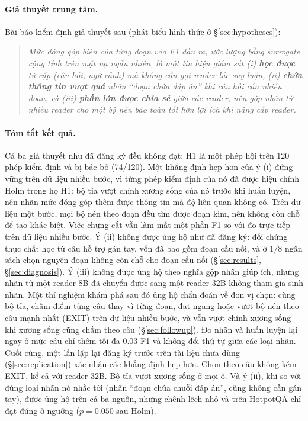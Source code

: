 \documentclass[11pt]{article}
\begin{document}
\paragraph{Giả thuyết trung tâm.} Bài báo kiểm định giả thuyết sau (phát biểu
hình thức ở \S\ref{sec:hypotheses}):
\begin{quote}\itshape
Mức đóng góp biên của từng đoạn vào F1 đầu ra, ước lượng bằng surrogate cộng tính
trên mặt nạ ngẫu nhiên, là một tín hiệu giám sát (i) \textbf{học được} từ cặp
(câu hỏi, ngữ cảnh) mà không cần gọi reader lúc suy luận, (ii) \textbf{chứa thông
tin vượt quá} nhãn ``đoạn chứa đáp án'' khi câu hỏi cần nhiều đoạn, và (iii)
\textbf{phần lớn được chia sẻ} giữa các reader, nên gộp nhãn từ nhiều reader cho một
bộ nén bảo toàn tốt hơn lợi ích khi nâng cấp reader.
\end{quote}

\paragraph{Tóm tắt kết quả.} Cả ba giả thuyết như đã đăng ký đều không đạt; H1 là một phép hội trên 120 phép kiểm
định và bị bác bỏ (74/120). Một khẳng định hẹp hơn của ý (i) đứng vững trên dữ liệu nhiều bước, vì từng phép kiểm
định của nó đã được hiệu chỉnh Holm trong họ H1: bộ tỉa vượt chính xương sống của nó trước khi huấn luyện, nên nhãn
mức đóng góp thêm được thông tin mà độ liên quan không có.
Trên dữ liệu một bước, mọi bộ nén theo đoạn đều tìm được đoạn kim, nên không còn chỗ để tạo khác biệt.
Việc chưng cất vẫn làm mất một phần F1 so với đo trực tiếp trên dữ liệu nhiều bước. Ý (ii) không được ủng
hộ như đã đăng ký: đối chứng thực chất học từ câu hỗ trợ gán tay, vốn đã bao gồm đoạn cầu nối, và ở $1/8$ ngân sách
chọn nguyên đoạn không còn chỗ cho đoạn cầu nối (\S\ref{sec:results}, \S\ref{sec:diagnosis}). Ý (iii) không được
ủng hộ theo nghĩa gộp nhãn giúp ích, nhưng nhãn từ một reader 8B đã chuyển được sang một reader 32B
không tham gia sinh nhãn. Một thí nghiệm khám phá sau đó ủng hộ chẩn đoán về đơn vị chọn: cùng bộ tỉa, chấm
điểm từng câu thay vì từng đoạn, đạt ngang hoặc vượt bộ nén theo câu mạnh nhất (EXIT) trên dữ liệu nhiều bước,
và vẫn vượt chính xương sống khi xương sống cũng chấm theo câu (\S\ref{sec:followup}). Đo nhãn và huấn luyện lại
ngay ở mức câu chỉ thêm tối đa 0.03 F1 và không đổi thứ tự giữa các loại nhãn. Cuối cùng, một lần lặp lại đăng ký
trước trên tài liệu chưa dùng (\S\ref{sec:replication}) xác nhận các khẳng định hẹp hơn. Chọn theo câu không kém
EXIT, kể cả với reader 32B. Bộ tỉa vượt xương sống ở mọi ô. Và ý (ii), khi so với đúng loại nhãn nó nhắc tới (nhãn
``đoạn chứa chuỗi đáp án'', cũng không cần gán tay), được ủng hộ trên cả ba nguồn, nhưng chênh lệch nhỏ và trên
HotpotQA chỉ đạt đúng ở ngưỡng ($p=0.050$ sau Holm).
\end{document}
